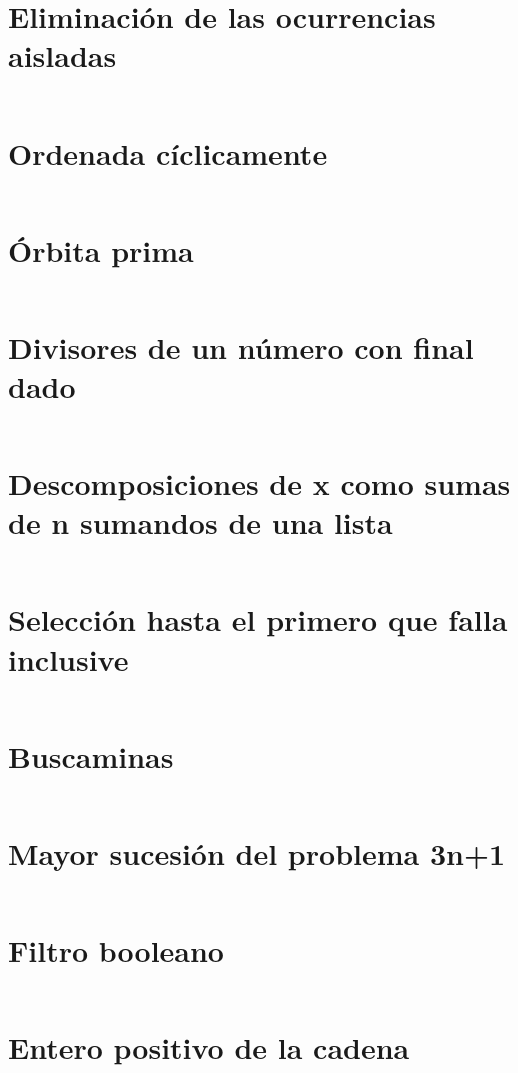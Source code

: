 \documentclass[a4paper,12pt,twoside]{book}
\newcommand{\ejercicio}[1]{\inputminted[firstline=7]{haskell}{../src/#1.hs}}
\begin{document}
\chapter{Eliminación de las ocurrencias aisladas}
\ejercicio{Elimina_aisladas}

\chapter{Ordenada cíclicamente}
\ejercicio{Ordenada_ciclicamente}

\chapter{Órbita prima}
\ejercicio{Orbita_prima}

\chapter{Divisores de un número con final dado}
\ejercicio{Divisores_con_final}

\chapter{Descomposiciones de x como sumas de n sumandos de una lista}
\ejercicio{Descomposiciones_con_n_sumandos}

\chapter{Selección hasta el primero que falla inclusive}
\ejercicio{Seleccion_con_fallo}

\chapter{Buscaminas}
\ejercicio{Buscaminas}

\chapter{Mayor sucesión del problema 3n+1}
\ejercicio{Mayor_sucesion_3n_mas_1}

\chapter{Filtro booleano}
\ejercicio{Filtro_booleano}

\chapter{Entero positivo de la cadena}
\ejercicio{Entero_positivo_de_la_cadena}
\end{document}
